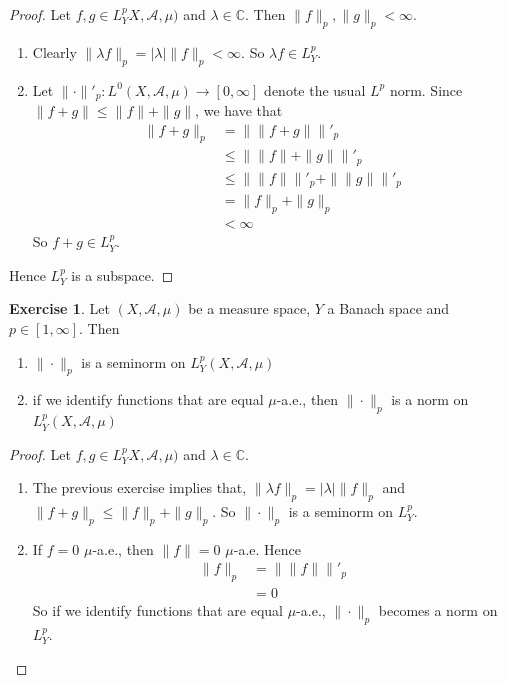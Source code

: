 \documentclass[12pt]{amsart}
\theoremstyle{definition}
\newtheorem{ex}[definition]{Exercise}
\newcommand{\lam}{\lambda}
\newcommand{\C}{\mathbb{C}}
\newcommand{\MA}{\mathcal{A}}
\newcommand{\RG}{[0,\infty]}
\begin{document}
	\begin{proof}Let $f, g \in L^p_YX, \MA, \mu)$ and $\lam \in \C$. Then $\|f\|_p, \|g\|_p < \infty$.
	\begin{enumerate}
	\item Clearly $\|\lam f\|_p = |\lam|\|f\|_p < \infty$.
	So $\lam f \in L^p_Y$.
	\item Let $\|\cdot \|'_p: L^0(X, \MA, \mu) \rightarrow \RG$ denote the usual $L^p$ norm. Since $\|f + g\| \leq \|f\| + \|g\|$, we have that 
	\begin{align*}
	\|f+g\|_p 
	&= \| \|f+g\| \|'_p \\
	& \leq \|\|f\| + \|g\| \|'_p \\
	& \leq  \|\|f\| \|'_p + \|\|g\| \|'_p \\
	&= \|f \|_p + \|g\|_p \\
	& < \infty
\end{align*}	
So $f+g \in L^p_Y$.
	\end{enumerate}
	Hence $L^p_Y$ is a subspace.
	\end{proof}
	
	\begin{ex}
	Let $(X, \MA, \mu)$ be a measure space, $Y$ a Banach space and $p \in [1, \infty]$. Then 
	\begin{enumerate}
	\item $\|\cdot\|_p$ is a seminorm on $L^p_Y(X, \MA, \mu)$
	\item if we identify functions that are equal $\mu$-a.e., then $\|\cdot\|_p$ is a norm on $L^p_Y(X, \MA, \mu)$
	\end{enumerate}
	\end{ex}
	
	\begin{proof} 
	Let $f, g \in L^p_YX, \MA, \mu)$ and $\lam \in \C$. 
	\begin{enumerate}
	\item The previous exercise implies that, $\|\lam f\|_p = |\lam|\|f\|_p$ and $\|f+g\|_p \leq \|f\|_p + \|g \|_p$. So $\|\cdot\|_p$ is a seminorm on $L_Y^p$.
	\item If $f = 0$ $\mu$-a.e., then $\|f\| = 0$  $\mu$-a.e. Hence
	\begin{align*}
	\|f\|_p 
	&= \|\|f\|\|'_p \\
	&= 0
\end{align*}
	So if we identify functions that are equal $\mu$-a.e., $\|\cdot\|_p$ becomes a norm on $L^p_Y$. 	  
	\end{enumerate}
	\end{proof}
	
\end{document}
